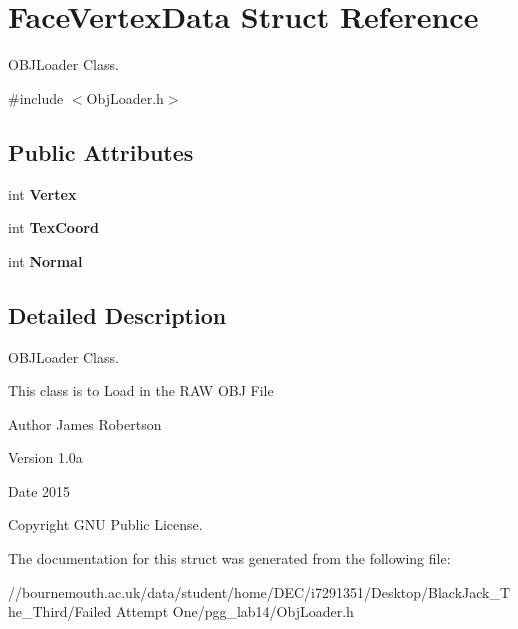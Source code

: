 \hypertarget{struct_face_vertex_data}{\section{Face\+Vertex\+Data Struct Reference}
\label{struct_face_vertex_data}
}


O\+B\+J\+Loader Class.  




{\ttfamily \#include $<$Obj\+Loader.\+h$>$}

\subsection*{Public Attributes}
\begin{DoxyCompactItemize}
\item 
\hypertarget{struct_face_vertex_data_a930584f15b8417bd0b82731a9bbe87ef}{int {\bfseries Vertex}}\label{struct_face_vertex_data_a930584f15b8417bd0b82731a9bbe87ef}

\item 
\hypertarget{struct_face_vertex_data_a8ca0a9a72a11654a561253a5fae5e20a}{int {\bfseries Tex\+Coord}}\label{struct_face_vertex_data_a8ca0a9a72a11654a561253a5fae5e20a}

\item 
\hypertarget{struct_face_vertex_data_a1f6463040c92c2485586a2ea5ab9d45b}{int {\bfseries Normal}}\label{struct_face_vertex_data_a1f6463040c92c2485586a2ea5ab9d45b}

\end{DoxyCompactItemize}


\subsection{Detailed Description}
O\+B\+J\+Loader Class. 

This class is to Load in the R\+A\+W O\+B\+J File \begin{DoxyAuthor}{Author}
James Robertson 
\end{DoxyAuthor}
\begin{DoxyVersion}{Version}
1.\+0a 
\end{DoxyVersion}
\begin{DoxyDate}{Date}
2015 
\end{DoxyDate}
\begin{DoxyCopyright}{Copyright}
G\+N\+U Public License. 
\end{DoxyCopyright}


The documentation for this struct was generated from the following file\+:\begin{DoxyCompactItemize}
\item 
//bournemouth.\+ac.\+uk/data/student/home/\+D\+E\+C/i7291351/\+Desktop/\+Black\+Jack\+\_\+\+The\+\_\+\+Third/\+Failed Attempt One/pgg\+\_\+lab14/Obj\+Loader.\+h\end{DoxyCompactItemize}
